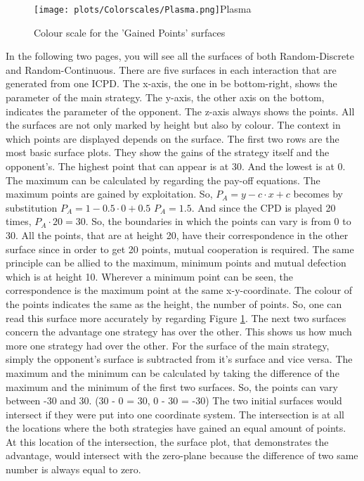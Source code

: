 \documentclass{article}
\begin{document}
\begin{figure}
\texttt{[image: plots/Colorscales/Plasma.png]}{Plasma}
\caption{Colour scale for the 'Gained Points' surfaces}
\label{fig:Plasma}
\end{figure}
In the following two pages, you will see all the surfaces of both Random-Discrete and Random-Continuous.
There are five surfaces in each interaction that are generated from one ICPD.
The x-axis, the one in be bottom-right, shows the parameter of the main strategy.
The y-axis, the other axis on the bottom, indicates the parameter of the opponent.
The z-axis always shows the points.
All the surfaces are not only marked by height but also by colour.
The context in which points are displayed depends on the surface. 
The first two rows are the most basic surface plots.
They show the gains of the strategy itself and the opponent's.
The highest point that can appear is at 30.
And the lowest is at 0.
The maximum can be calculated by regarding the pay-off equations.
The maximum points are gained by exploitation.
So, $P_A =  y - c \cdot x + c$ becomes by substitution $P_A = 1 - 0.5 \cdot 0 + 0.5$ \textrightarrow $P_A = 1.5$.
And since the CPD is played 20 times, $P_A \cdot 20 = 30$.
So, the boundaries in which the points can vary is from 0 to 30.
All the points, that are at height 20, have their correspondence in the other surface since in order to get 20 points, mutual cooperation is required.
The same principle can be allied to the maximum, minimum points and mutual defection which is at height 10.
Wherever a minimum point can be seen, the correspondence is the maximum point at the same x-y-coordinate.
The colour of the points indicates the same as the height, the number of points.
So, one can read this surface more accurately by regarding Figure \ref{fig:Plasma}.
The next two surfaces concern the advantage one strategy has over the other.
This shows us how much more one strategy had over the other.
For the surface of the main strategy, simply the opponent's surface is subtracted from it's surface and vice versa.
The maximum and the minimum can be calculated by taking the difference of the maximum and the minimum of the first two surfaces.
So, the points can vary between -30 and 30.
(30 - 0 = 30, 0 - 30 = -30)
The two initial surfaces would intersect if they were put into one coordinate system.
The intersection is at all the locations where the both strategies have gained an equal amount of points.
At this location of the intersection, the surface plot, that demonstrates the advantage, would intersect with the zero-plane because the difference of two same number is always equal to zero.\\
\end{document}
